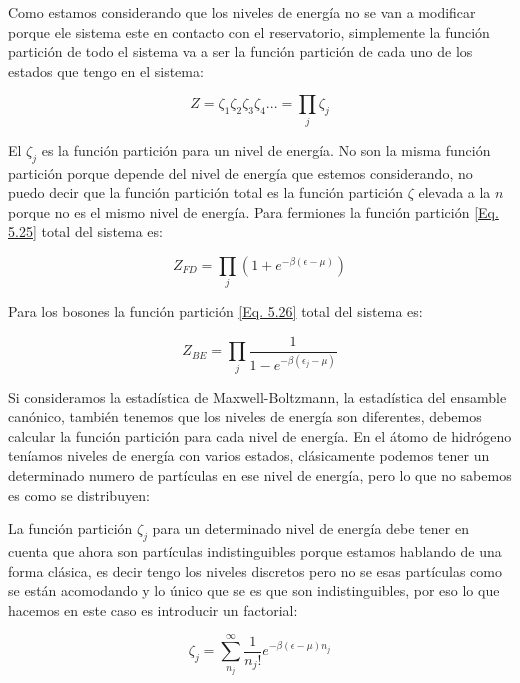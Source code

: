 \documentclass[11pt,fleqn]{book}
\begin{document}
Como estamos considerando que los niveles de energía no se van a modificar porque ele sistema este en contacto con el reservatorio, simplemente la función partición de todo el sistema va a ser la función partición de cada uno de los estados que tengo en el sistema:

\begin{equation}
    Z=\zeta_{1}\zeta_{2}\zeta_{3}\zeta_{4}...=\prod_{j}\zeta_{j}
\end{equation}

El $\zeta_{j}$ es la función partición para un nivel de energía. No son la misma función partición porque depende del nivel de energía que estemos considerando, no puedo decir que la función partición total es la función partición $\zeta$ elevada a la $n$ porque no es el mismo nivel de energía. Para fermiones la función partición \ref{Eq. 5.25} total del sistema es:

\begin{equation}
    Z_{FD}=\prod_{j}(1+e^{-\beta(\epsilon-\mu)})
    \label{Eq. 5.31}
\end{equation}

Para los bosones la función partición \ref{Eq. 5.26} total del sistema es:

\begin{equation}
    Z_{BE}=\prod_{j}\frac{1}{1-e^{-\beta(\epsilon_{j}-\mu)}}
    \label{Eq. 5.32}
\end{equation}

Si consideramos la estadística de Maxwell-Boltzmann, la estadística del ensamble canónico, también tenemos que los niveles de energía son diferentes, debemos calcular la función partición para cada nivel de energía. En el átomo de hidrógeno teníamos niveles de energía con varios estados, clásicamente podemos tener un determinado numero de partículas en ese nivel de energía, pero lo que no sabemos es como se distribuyen:


La función partición $\zeta_{j}$ para un determinado nivel de energía debe tener en cuenta que ahora son partículas indistinguibles porque estamos hablando de una forma clásica, es decir tengo los niveles discretos pero no se esas partículas como se están acomodando y lo único que se es que son indistinguibles, por eso lo que hacemos en este caso es introducir un factorial:

\begin{equation}
    \zeta_{j}=\sum_{n_{j}}^{\infty}\frac{1}{n_{j}!}e^{-\beta(\epsilon-\mu)n_{j}}
    \label{Eq. 5.33}
\end{equation}
\end{document}
